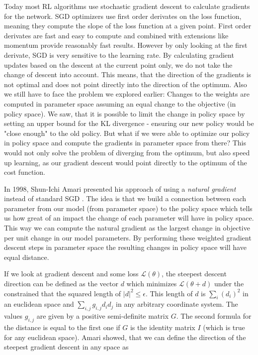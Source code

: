 Today most RL algorithms use stochastic gradient descent to calculate gradients for the network. SGD optimizers use first order derivates on the loss function, meaning they compute the slope of the loss function at a given point. First order derivates are fast and easy to compute and combined with extensions like momentum provide reasonably fast results. However by only looking at the first derivate, SGD is very sensitive to the learning rate. By calculating gradient updates based on the descent at the current point only, we do not take the change of descent into account. This means, that the direction of the gradients is not optimal and does not point directly into the direction of the optimum. Also we still have to face the problem we explored earlier: Changes to the weights are computed in parameter space assuming an equal change to the objective (in policy space). We saw, that it is possible to limit the change in policy space by setting an upper bound for the KL divergence - ensuring our new policy would be "close enough" to the old policy. But what if we were able to optimize our policy in policy space and compute the gradients in parameter space from there? This would not only solve the problem of diverging from the optimum, but also speed up learning, as our gradient descent would point directly to the optimum of the cost function.

In 1998, Shun-Ichi Amari presented his approach of using a \textit{natural gradient} instead of standard SGD \cite{amari1998natural}. The idea is that we build a connection between each parameter from our model (from parameter space) to the policy space which tells us how great of an impact the change of each parameter will have in policy space. This way we can compute the natural gradient as the largest change in objective per unit change in our model parameters. By performing these weighted gradient descent steps in parameter space the resulting changes in policy space will have equal distance.

If we look at gradient descent and some loss $\mathcal{L}(\theta)$, the steepest descent direction can be defined as the vector $d$ which minimizes $\mathcal{L}(\theta + d)$ under the constrained that the squared length of $|d|^2 \leq \epsilon$. This length of $d$ is $\sum_i (d_i)^2$ in an euclidean space and $\sum_{i, j} g_{i, j}d_i d_j$ in any arbitrary coordinate system. The values $g_{i, j}$ are given by a positive semi-definite matrix $G$. The second formula for the distance is equal to the first one if $G$ is the identity matrix $I$ (which is true for any euclidean space). Amari showed, that we can define the direction of the steepest gradient descent in any space as 


